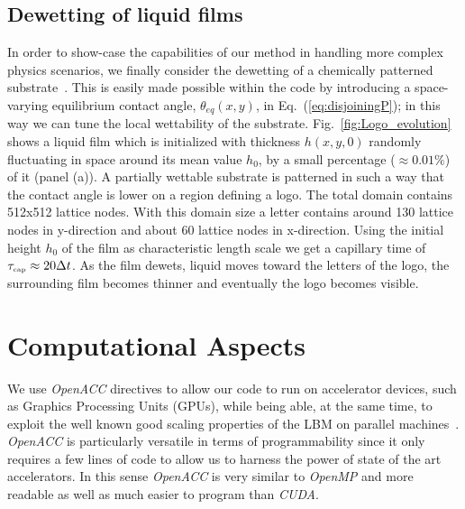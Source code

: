 \subsection{Dewetting of liquid films}
In order to show-case the capabilities of our method in handling more complex physics scenarios, we finally consider the dewetting of a chemically patterned substrate~\cite{karguptaDewettingThinFilms2002,brasjenDewettingThinLiquid2013}. 
This is easily made possible within the code by introducing a space-varying equilibrium contact angle, $\theta_{eq}(x,y)$, in Eq.~(\ref{eq:disjoiningP}); in this way we can tune the local wettability of the substrate. 
Fig.~\ref{fig:Logo_evolution} shows a liquid film which is initialized with thickness $h(x,y,0)$ randomly fluctuating in space around its mean value $h_0$, by a small percentage ($\approx 0.01\%$)  of it (panel (a)). 
A partially wettable substrate is patterned in such a way that the contact angle is lower on a region defining a logo. 
The total domain contains 512x512 lattice nodes. 
With this domain size a letter contains around 130 lattice nodes in y-direction and about 60 lattice nodes in x-direction.
Using the initial height $h_0$ of the film as characteristic length scale we get a capillary time of $\tau_{\mbox{\tiny{cap}}} \approx 20\Delta t$. 
As the film dewets, liquid moves toward the letters of the logo, the surrounding film becomes thinner and eventually the logo becomes visible.

\section{Computational Aspects}
We use \textit{OpenACC} directives to allow our code to run on accelerator devices, such as Graphics Processing Units (GPUs), while being able, at the same time, to exploit the well known good scaling properties of the LBM on parallel machines~\cite{chandrasekaranOpenACCProgrammersConcepts2017}. 
\textit{OpenACC} is particularly versatile in terms of programmability since it only requires a few lines of code to allow us to harness the power of state of the art accelerators. 
In this sense \textit{OpenACC} is very similar to \textit{OpenMP} and more readable as well as much easier to program than \textit{CUDA}.

